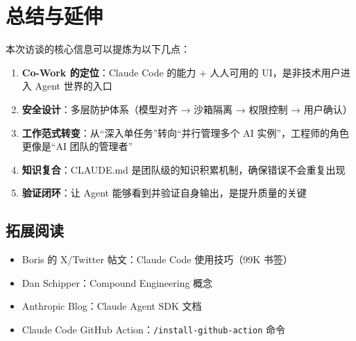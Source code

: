 \section{总结与延伸}

本次访谈的核心信息可以提炼为以下几点：

\begin{enumerate}
    \item \textbf{Co-Work 的定位}：Claude Code 的能力 + 人人可用的 UI，是非技术用户进入 Agent 世界的入口
    \item \textbf{安全设计}：多层防护体系（模型对齐 → 沙箱隔离 → 权限控制 → 用户确认）
    \item \textbf{工作范式转变}：从``深入单任务''转向``并行管理多个 AI 实例''，工程师的角色更像是``AI 团队的管理者''
    \item \textbf{知识复合}：CLAUDE.md 是团队级的知识积累机制，确保错误不会重复出现
    \item \textbf{验证闭环}：让 Agent 能够看到并验证自身输出，是提升质量的关键
\end{enumerate}

\subsection{拓展阅读}

\begin{itemize}
    \item Boris 的 X/Twitter 帖文：Claude Code 使用技巧（99K 书签）
    \item Dan Schipper：Compound Engineering 概念
    \item Anthropic Blog：Claude Agent SDK 文档
    \item Claude Code GitHub Action：\texttt{/install-github-action} 命令
\end{itemize}



